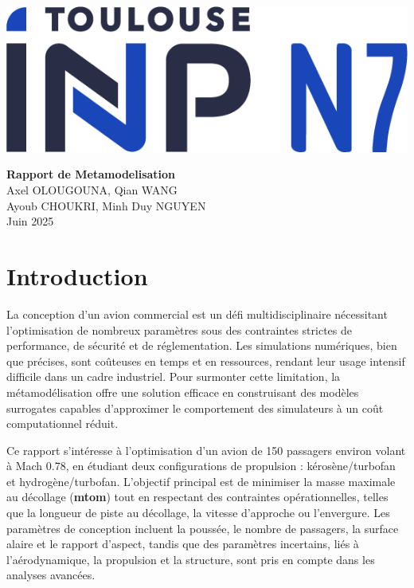 \documentclass[a4paper, 11pt]{article}
\begin{document}
\begin{titlepage}
\begin{center}
    \includegraphics[width=0.3\linewidth]{Logo-toulouse-inp-N7.png}
\end{center}
    \centering
    \vspace*{3in} %
    \Huge \textbf{Rapport de Metamodelisation} \\[1cm] %
    \Large {Axel OLOUGOUNA, Qian WANG}\\ %
            {Ayoub CHOUKRI, Minh Duy NGUYEN} \\
    \Large Juin 2025 %
    \vfill
\end{titlepage}

\newpage

\tableofcontents

\newpage

\section{Introduction}
La conception d’un avion commercial est un défi multidisciplinaire nécessitant l’optimisation de nombreux paramètres sous des contraintes strictes de performance, de sécurité et de réglementation. Les simulations numériques, bien que précises, sont coûteuses en temps et en ressources, rendant leur usage intensif difficile dans un cadre industriel. Pour surmonter cette limitation, la métamodélisation offre une solution efficace en construisant des modèles surrogates capables d’approximer le comportement des simulateurs à un coût computationnel réduit. \newline

Ce rapport s’intéresse à l’optimisation d’un avion de 150 passagers environ volant à Mach 0.78, en étudiant deux configurations de propulsion : kérosène/turbofan et hydrogène/turbofan. L’objectif principal est de minimiser la masse maximale au décollage (\textbf{mtom}) tout en respectant des contraintes opérationnelles, telles que la longueur de piste au décollage, la vitesse d’approche ou l’envergure. Les paramètres de conception incluent la poussée, le nombre de passagers, la surface alaire et le rapport d’aspect, tandis que des paramètres incertains, liés à l’aérodynamique, la propulsion et la structure, sont pris en compte dans les analyses avancées. \newline
\end{document}
